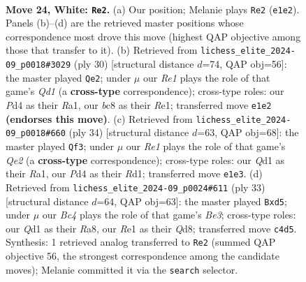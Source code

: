 \documentclass[11pt]{article}
\begin{document}
\begin{figure}[p]
\label{fig:thought-m44}
\end{figure}

\clearpage

\begin{figure}[p]\centering
\begin{subfigure}{0.46\textwidth}\centering
\resizebox{\linewidth}{!}{%
\newchessgame
\chessboard[
  setfen={r1b5/pp1nq1k1/2p1r1p1/6pp/2BPN3/5PP1/PP5P/2RQR1K1 w - - 0 24},
  showmover=false,
  pgfstyle=straightmove, color=movearrow, markmove={e1-e2}
]}
\caption{}
\end{subfigure}\hfill
\begin{subfigure}{0.46\textwidth}\centering
\resizebox{\linewidth}{!}{%
\newchessgame
\chessboard[
  setfen={rnbr2k1/pp3ppp/2p2q2/8/P2N4/6PP/1PP2PB1/R2QR1K1 w - - 2 16},
  showmover=false,
  pgfstyle=straightmove, color=movearrow, markmove={d1-e2}
]}
\caption{}
\end{subfigure}
\\[4pt]
\begin{subfigure}{0.46\textwidth}\centering
\resizebox{\linewidth}{!}{%
\newchessgame
\chessboard[
  setfen={r3r1k1/ppq3pp/2pb4/3nNpp1/2BP4/2P4P/PP2QP2/R2R2K1 w - - 0 18},
  showmover=false,
  pgfstyle=straightmove, color=movearrow, markmove={e2-f3}
]}
\caption{}
\end{subfigure}\hfill
\begin{subfigure}{0.46\textwidth}\centering
\resizebox{\linewidth}{!}{%
\newchessgame
\chessboard[
  setfen={r2qk2r/ppp2p2/3pb2p/3Nn2P/2PQ4/5P2/PP4P1/2KR1B1R b kq - 0 17},
  showmover=false,
  pgfstyle=straightmove, color=movearrow, markmove={e6-d5}
]}
\caption{}
\end{subfigure}
\caption{\textbf{Move 24, White: \texttt{Re2}.} (a) Our position; Melanie plays \texttt{Re2} (\texttt{e1e2}). Panels (b)--(d) are the retrieved master positions whose correspondence most drove this move (highest QAP objective among those that transfer to it). (b) Retrieved from \texttt{lichess\_elite\_2024-09\_p0018\#3029} (ply 30) [structural distance $d$=74, QAP obj=56]: the master played \texttt{Qe2}; under $\mu$ our \emph{Re1} plays the role of that game's \emph{Qd1} (a \textbf{cross-type} correspondence); cross-type roles: our \emph{P}d4 as their \emph{R}a1, our \emph{b}c8 as their \emph{R}e1; transferred move \texttt{e1e2} \textbf{(endorses this move)}. (c) Retrieved from \texttt{lichess\_elite\_2024-09\_p0018\#660} (ply 34) [structural distance $d$=63, QAP obj=68]: the master played \texttt{Qf3}; under $\mu$ our \emph{Re1} plays the role of that game's \emph{Qe2} (a \textbf{cross-type} correspondence); cross-type roles: our \emph{Q}d1 as their \emph{R}a1, our \emph{P}d4 as their \emph{R}d1; transferred move \texttt{e1e3}. (d) Retrieved from \texttt{lichess\_elite\_2024-09\_p0024\#611} (ply 33) [structural distance $d$=64, QAP obj=63]: the master played \texttt{Bxd5}; under $\mu$ our \emph{Bc4} plays the role of that game's \emph{Be3}; cross-type roles: our \emph{Q}d1 as their \emph{R}a8, our \emph{R}e1 as their \emph{Q}d8; transferred move \texttt{c4d5}. Synthesis: 1 retrieved analog transferred to \texttt{Re2} (summed QAP objective 56, the strongest correspondence among the candidate moves); Melanie committed it via the \texttt{search} selector.}

\end{figure}
\end{document}
